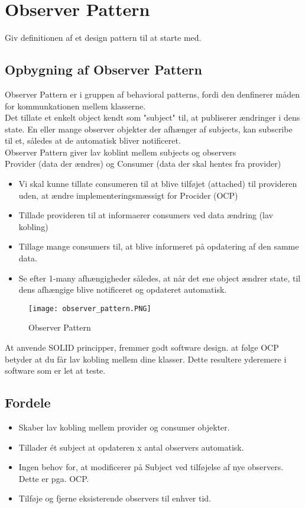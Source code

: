 \documentclass[../SWD_disp.tex]{subfiles}
\begin{document}
\section{Observer Pattern}

Giv definitionen af et design pattern til at starte med.

\subsection{Opbygning af Observer Pattern}
Observer Pattern er i gruppen af behavioral patterns, fordi den denfinerer måden for kommunkationen mellem klasserne.
\\

Det tillate et enkelt object kendt som "subject" til, at publiserer ændringer i dens state. En eller mange observer objekter der afhænger af subjects, kan subscribe til et, således at de automatisk bliver notificeret.
\\

Observer Pattern giver lav koblint mellem subjects og observers
\\

Provider (data der ændres) og Consumer (data der skal hentes fra provider)
\begin{itemize}
    \item Vi skal kunne tillate consumeren til at blive tilføjet (attached) til provideren uden, at ændre implementeringsmæssigt for Procider (OCP)
    \item Tillade provideren til at informaerer consumers ved data ændring (lav kobling)
    \item Tillage mange consumers til, at blive informeret på opdatering af den samme data.
    \item Se efter 1-many afhængigheder således, at når det ene object ændrer state, til dens afhængige blive notificeret og opdateret automatisk.
\end{itemize}

\begin{figure}[H]
    \centering
    \texttt{[image: observer\_pattern.PNG]}
    \caption{Observer Pattern}
    \label{fig:observer_pattern}
\end{figure}

At anvende SOLID principper, fremmer godt software design. at følge OCP betyder at du får lav kobling mellem dine klasser. Dette resultere yderemere i software som er let at teste.

\subsection*{Fordele}
\begin{itemize}
    \item Skaber lav kobling mellem provider og consumer objekter.
    \item Tillader ét subject at opdateren x antal observers automatisk. 
    \item Ingen behov for, at modificerer på Subject ved tilføjelse af nye observers. Dette er pga. OCP.
    \item Tilføje og fjerne eksisterende observers til enhver tid.
\end{itemize}
\end{document}

